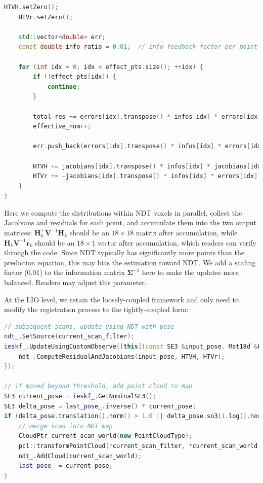 \begin{lstlisting}[language=c++,caption=src/ch7/ndt\_inc.cc]
	HTVH.setZero();
	HTVr.setZero();
	
	std::vector<double> err;
	const double info_ratio = 0.01;  // info feedback factor per point
	
	for (int idx = 0; idx < effect_pts.size(); ++idx) {
		if (!effect_pts[idx]) {
			continue;
		}
		
		total_res += errors[idx].transpose() * infos[idx] * errors[idx];
		effective_num++;
		
		err.push_back(errors[idx].transpose() * infos[idx] * errors[idx]);
		
		HTVH += jacobians[idx].transpose() * infos[idx] * jacobians[idx] * info_ratio;
		HTVr += -jacobians[idx].transpose() * infos[idx] * errors[idx] * info_ratio;
	}
}
\end{lstlisting}

Here we compute the distributions within NDT voxels in parallel, collect the Jacobians and residuals for each point, and accumulate them into the two output matrices: $\bm{H}_k^\top \bm{V}^{-1} \bm{H}_k$ should be an $18 \times 18$ matrix after accumulation, while $\bm{H}_k \bm{V}^{-1} \bm{r}_k$ should be an $18\times 1$ vector after accumulation, which readers can verify through the code. Since NDT typically has significantly more points than the prediction equation, this may bias the estimation toward NDT. We add a scaling factor (0.01) to the information matrix $\boldsymbol{\Sigma}^{-1}$ here to make the updates more balanced. Readers may adjust this parameter.

At the LIO level, we retain the loosely-coupled framework and only need to modify the registration process to the tightly-coupled form:

\begin{lstlisting}[language=c++,caption=src/ch8/lio-iekf/lio\_iekf.cc]
// subsequent scans, update using NDT with pose
ndt_.SetSource(current_scan_filter);
ieskf_.UpdateUsingCustomObserve([this](const SE3 &input_pose, Mat18d &HTVH, Vec18d &HTVr) {
	ndt_.ComputeResidualAndJacobians(input_pose, HTVH, HTVr);
});

// if moved beyond threshold, add point cloud to map
SE3 current_pose = ieskf_.GetNominalSE3();
SE3 delta_pose = last_pose_.inverse() * current_pose;
if (delta_pose.translation().norm() > 1.0 || delta_pose.so3().log().norm() > math::deg2rad(10)) {
	// merge scan into NDT map
	CloudPtr current_scan_world(new PointCloudType);
	pcl::transformPointCloud(*current_scan_filter, *current_scan_world, current_pose.matrix());
	ndt_.AddCloud(current_scan_world);
	last_pose_ = current_pose;
}
\end{lstlisting}


